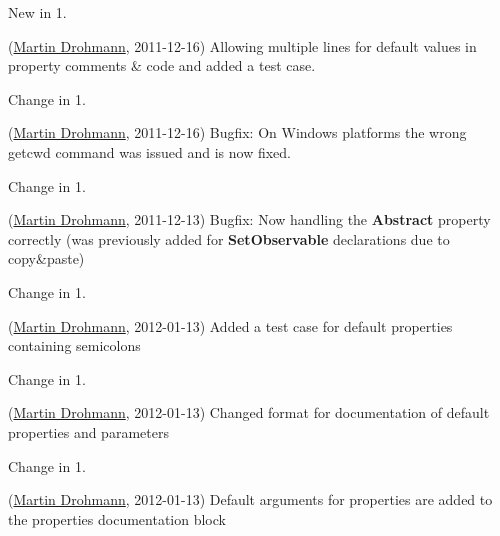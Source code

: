 \begin{DoxyRefDesc}{New in 1.}
\item[\hyperlink{newfeat1_3__newfeat1_3000003}{New in 1.\+3}](\hyperlink{developers_md}{Martin Drohmann}, 2011-\/12-\/16) Allowing multiple lines for default values in property comments \& code and added a test case.\end{DoxyRefDesc}


\begin{DoxyRefDesc}{Change in 1.}
\item[\hyperlink{changelog1_3__changelog1_3000013}{Change in 1.\+3}](\hyperlink{developers_md}{Martin Drohmann}, 2011-\/12-\/16) Bugfix\+: On Windows platforms the wrong {\ttfamily getcwd} command was issued and is now fixed.\end{DoxyRefDesc}


\begin{DoxyRefDesc}{Change in 1.}
\item[\hyperlink{changelog1_3__changelog1_3000014}{Change in 1.\+3}](\hyperlink{developers_md}{Martin Drohmann}, 2011-\/12-\/13) Bugfix\+: Now handling the {\bfseries Abstract} property correctly (was previously added for {\bfseries Set\+Observable} declarations due to copy\&paste)\end{DoxyRefDesc}


\begin{DoxyRefDesc}{Change in 1.}
\item[\hyperlink{changelog1_3__changelog1_3000015}{Change in 1.\+3}](\hyperlink{developers_md}{Martin Drohmann}, 2012-\/01-\/13) Added a test case for default properties containing semicolons\end{DoxyRefDesc}


\begin{DoxyRefDesc}{Change in 1.}
\item[\hyperlink{changelog1_3__changelog1_3000016}{Change in 1.\+3}](\hyperlink{developers_md}{Martin Drohmann}, 2012-\/01-\/13) Changed format for documentation of default properties and parameters\end{DoxyRefDesc}


\begin{DoxyRefDesc}{Change in 1.}
\item[\hyperlink{changelog1_3__changelog1_3000017}{Change in 1.\+3}](\hyperlink{developers_md}{Martin Drohmann}, 2012-\/01-\/13) Default arguments for properties are added to the properties documentation block\end{DoxyRefDesc}


